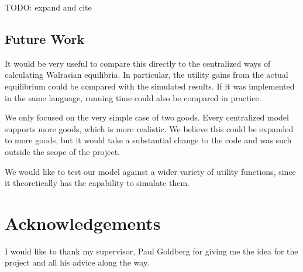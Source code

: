 \documentclass[12pt,a4paper,titlepage]{article}
\begin{document}
TODO: expand and cite


\subsection{Future Work}
It would be very useful to compare this directly to the centralized ways of calculating Walrasian equilibria.
In particular, the utility gains from the actual equilibrium could be compared with the simulated results.
If it was implemented in the same language, running time could also be compared in practice.

We only focused on the very simple case of two goods.
Every centralized model supports more goods, which is more realistic.
We believe this could be expanded to more goods, but it would take a substantial change to the code and was such outside the scope of the project.

We would like to test our model against a wider variety of utility functions, since it theoretically has the capability to simulate them.


\section{Acknowledgements}\label{acknowledgements}
I would like to thank my supervisor, Paul Goldberg for giving me the idea for the project and all his advice along the way.


\printbibliography
\end{document}
